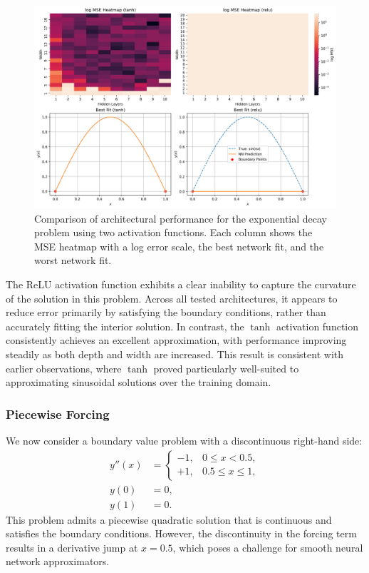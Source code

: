 \begin{figure}[htbp]
    \centering
    \includegraphics[width=\textwidth]{graphics/bvp_poisson_combined.png}
    \caption{Comparison of architectural performance for the exponential decay problem using two 
    activation functions. Each column shows the MSE heatmap with a log error scale,
    the best network fit, and the worst network fit.}
    \label{fig:bvp_poisson_sidebyside}
\end{figure}

The ReLU activation function exhibits a clear inability to capture the curvature of the solution 
in this problem. Across all tested architectures, it appears to reduce error primarily by satisfying
the boundary conditions, rather than accurately fitting the interior solution. In contrast, 
the $\tanh$ activation function consistently achieves an excellent approximation, with 
performance improving steadily as both depth and width are increased. This result is 
consistent with earlier observations, where $\tanh$ proved particularly well-suited to 
approximating sinusoidal solutions over the training domain.

\subsubsection{Piecewise Forcing}

We now consider a boundary value problem with a discontinuous right-hand side:
\[
\begin{aligned}
    y''(x) &= 
    \begin{cases}
        -1, & 0 \leq x < 0.5, \\
        +1, & 0.5 \leq x \leq 1,
    \end{cases} \\
    y(0) &= 0, \\
    y(1) &= 0.
\end{aligned}
\]
This problem admits a piecewise quadratic solution that is continuous and satisfies the boundary 
conditions. However, the discontinuity in the forcing term results in a derivative jump at 
\( x = 0.5 \), which poses a challenge for smooth neural network approximators.

